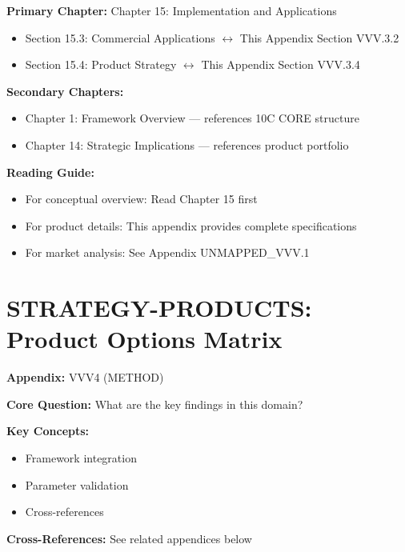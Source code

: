 \begin{tcolorbox}[colback=purple!5!white, colframe=purple!75!black,
    title=Chapter Linkage]

\textbf{Primary Chapter:} Chapter 15: Implementation and Applications
\begin{itemize}[nosep]
\item Section 15.3: Commercial Applications $\leftrightarrow$ This Appendix Section VVV.3.2
\item Section 15.4: Product Strategy $\leftrightarrow$ This Appendix Section VVV.3.4
\end{itemize}

\textbf{Secondary Chapters:}
\begin{itemize}[nosep]
\item Chapter 1: Framework Overview --- references 10C CORE structure
\item Chapter 14: Strategic Implications --- references product portfolio
\end{itemize}

\textbf{Reading Guide:}
\begin{itemize}[nosep]
\item For conceptual overview: Read Chapter 15 first
\item For product details: This appendix provides complete specifications
\item For market analysis: See Appendix UNMAPPED_VVV.1
\end{itemize}

\end{tcolorbox}


\chapter{STRATEGY-PRODUCTS: Product Options Matrix}
\label{app:vvv3-products}


\begin{tcolorbox}[colback=blue!5!white, colframe=blue!75!black,
    title=Quick Reference: Appendix UNMAPPED_VVV4]

\textbf{Appendix:} VVV4 (METHOD)

\textbf{Core Question:} What are the key findings in this domain?

\textbf{Key Concepts:}
\begin{itemize}[nosep]
\item Framework integration
\item Parameter validation
\item Cross-references
\end{itemize}

\textbf{Cross-References:} See related appendices below
\end{tcolorbox}

